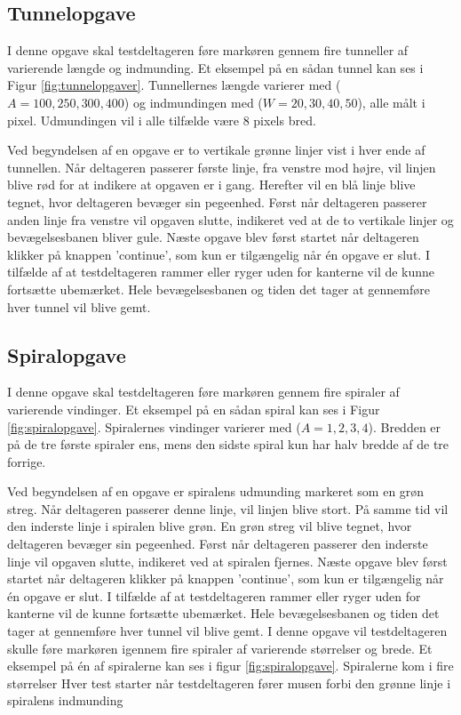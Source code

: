 \subsection*{Tunnelopgave}
I denne opgave skal testdeltageren føre markøren gennem fire tunneller af varierende længde og indmunding. Et eksempel på en sådan tunnel kan ses i Figur \ref{fig:tunnelopgaver}. Tunnellernes længde varierer med ($A = 100, 250, 300, 400$) og indmundingen med ($W = 20, 30 ,40, 50$), alle målt i pixel. Udmundingen vil i alle tilfælde være 8 pixels bred.

Ved begyndelsen af en opgave er to vertikale grønne linjer vist i hver ende af tunnellen. Når deltageren passerer første linje, fra venstre mod højre, vil linjen blive rød for at indikere at opgaven er i gang. Herefter vil en blå linje blive tegnet, hvor deltageren bevæger sin pegeenhed. Først når deltageren passerer anden linje fra venstre vil opgaven slutte, indikeret ved at de to vertikale linjer og bevægelsesbanen bliver gule. Næste opgave blev først startet når deltageren klikker på knappen 'continue', som kun er tilgængelig når én opgave er slut. I tilfælde af at testdeltageren rammer eller ryger uden for kanterne vil de kunne fortsætte ubemærket. Hele bevægelsesbanen og tiden det tager at gennemføre hver tunnel vil blive gemt.\\

\subsection*{Spiralopgave}
I denne opgave skal testdeltageren føre markøren gennem fire spiraler af varierende vindinger. Et eksempel på en sådan spiral kan ses i Figur \ref{fig:spiralopgave}. Spiralernes vindinger varierer med ($A = 1, 2, 3, 4$). Bredden er på de tre første spiraler ens, mens den sidste spiral kun har halv bredde af de tre forrige.

Ved begyndelsen af en opgave er spiralens udmunding markeret som en grøn streg. Når deltageren passerer denne linje, vil linjen blive stort. På samme tid vil den inderste linje i spiralen blive grøn. En grøn streg vil blive tegnet, hvor deltageren bevæger sin pegeenhed. Først når deltageren passerer den inderste linje vil opgaven slutte, indikeret ved at spiralen fjernes. Næste opgave blev først startet når deltageren klikker på knappen 'continue', som kun er tilgængelig når én opgave er slut. I tilfælde af at testdeltageren rammer eller ryger uden for kanterne vil de kunne fortsætte ubemærket. Hele bevægelsesbanen og tiden det tager at gennemføre hver tunnel vil blive gemt.
I denne opgave vil testdeltageren skulle føre markøren igennem fire spiraler af varierende størrelser og brede. Et eksempel på én af spiralerne kan ses i figur \ref{fig:spiralopgave}. Spiralerne kom i fire størrelser Hver test starter når testdeltageren fører musen forbi den grønne linje i spiralens indmunding

